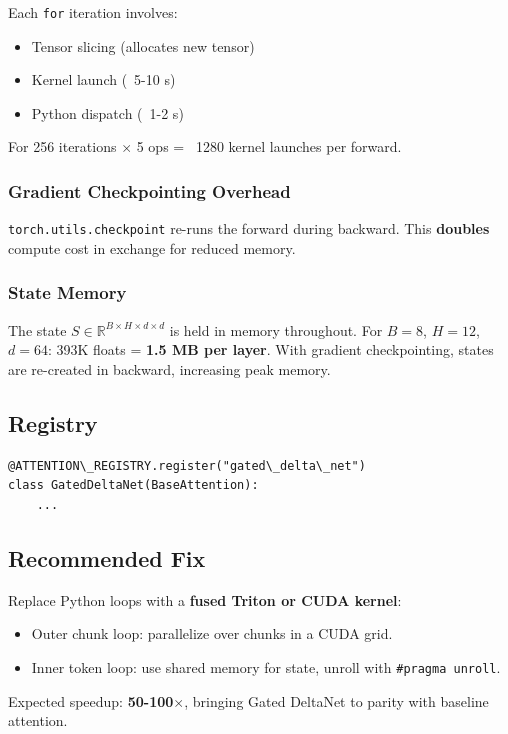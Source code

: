 Each \texttt{for} iteration involves:
\begin{itemize}
\item Tensor slicing (allocates new tensor)
\item Kernel launch (~5-10  s)
\item Python dispatch (~1-2  s)

\end{itemize}
For 256 iterations $\times$ 5 ops = ~1280 kernel launches per forward.

\subsubsection{Gradient Checkpointing Overhead}

\texttt{torch.utils.checkpoint} re-runs the forward during backward. This \textbf{doubles} 
compute cost in exchange for reduced memory.

\subsubsection{State Memory}

The state $S \in \mathbb{R}^{B \times H \times d \times d}$ is held in memory 
throughout. For $B=8$, $H=12$, $d=64$: 393K floats = \textbf{1.5 MB per layer}. 
With gradient checkpointing, states are re-created in backward, increasing 
peak memory.

\subsection{Registry}

\begin{lstlisting}
@ATTENTION\_REGISTRY.register("gated\_delta\_net")
class GatedDeltaNet(BaseAttention):
    ...
\end{lstlisting}

\subsection{Recommended Fix}

Replace Python loops with a \textbf{fused Triton or CUDA kernel}:

\begin{itemize}
\item Outer chunk loop: parallelize over chunks in a CUDA grid.
\item Inner token loop: use shared memory for state, unroll with \texttt{\#pragma unroll}.

\end{itemize}
Expected speedup: \textbf{50-100$\times$}, bringing Gated DeltaNet to parity with 
baseline attention.



